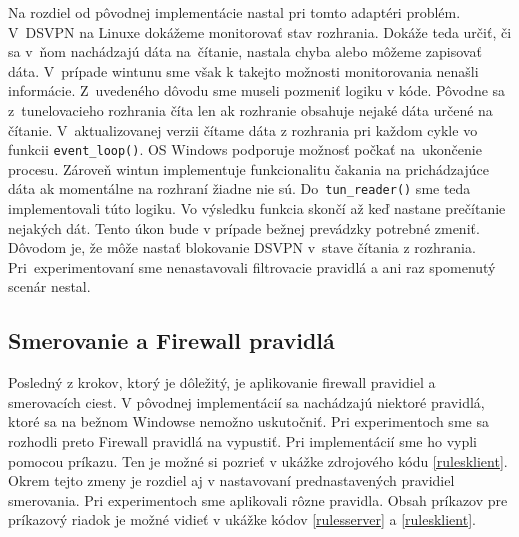 Na rozdiel od pôvodnej implementácie nastal pri tomto adaptéri problém. V~DSVPN na Linuxe dokážeme monitorovať stav rozhrania. Dokáže teda určiť, či sa v~ňom nachádzajú dáta na~čítanie, nastala chyba alebo môžeme zapisovať dáta. V~prípade wintunu sme však k takejto možnosti monitorovania nenašli informácie. Z~uvedeného dôvodu sme museli pozmeniť logiku v kóde. Pôvodne sa z~tunelovacieho rozhrania číta len ak rozhranie obsahuje nejaké dáta určené na čítanie. V~aktualizovanej verzii čítame dáta z rozhrania pri každom cykle vo funkcii \lstinline|event_loop()|. OS Windows podporuje možnosť počkať na~ukončenie procesu. Zároveň wintun implementuje funkcionalitu čakania na prichádzajúce dáta ak momentálne na rozhraní žiadne nie sú. Do~\lstinline|tun_reader()| sme teda implementovali túto logiku. Vo výsledku funkcia skončí až keď nastane prečítanie nejakých dát. Tento úkon bude v prípade bežnej prevádzky potrebné zmeniť. Dôvodom je, že môže nastať blokovanie DSVPN v~stave čítania z rozhrania. Pri~experimentovaní sme nenastavovali filtrovacie pravidlá a ani raz spomenutý scenár nestal. 

\subsection{Smerovanie a Firewall pravidlá}
Posledný z krokov, ktorý je dôležitý, je aplikovanie firewall pravidiel a smerovacích ciest. V pôvodnej implementácií sa nachádzajú niektoré pravidlá, ktoré sa na bežnom Windowse nemožno uskutočniť. Pri experimentoch sme sa rozhodli preto Firewall pravidlá na vypustiť. Pri implementácií sme ho vypli pomocou príkazu. Ten je možné si pozrieť v ukážke zdrojového kódu \ref{rulesklient}. Okrem tejto zmeny je rozdiel aj v nastavovaní prednastavených pravidiel smerovania. Pri experimentoch sme aplikovali rôzne pravidla. Obsah príkazov pre príkazový riadok je možné vidieť v ukážke kódov \ref{rulesserver} a \ref{rulesklient}.

